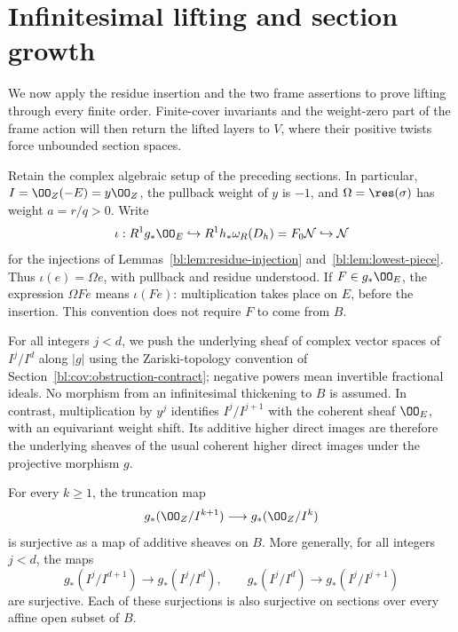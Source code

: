 \section{Infinitesimal lifting and section growth}\label{bl:sec:lifting}

We now apply the residue insertion and the two frame assertions to
prove lifting through every finite order. Finite-cover invariants
and the weight-zero part of the frame action will then return the
lifted layers to \(V\), where their positive twists force unbounded
section spaces.

Retain the complex algebraic setup of the preceding sections.
In particular, \(I=\OO_Z(-E)=y\OO_Z\), the pullback weight of \(y\) is \(-1\), and
\(\Omega=\res(\sigma)\) has weight \(a=r/q>0\).  Write
\begin{equation}\label{bl:lift:insertion}
 \iota:R^1g_*\OO_E\hookrightarrow
 R^1h_*\omega_R(D_h)=F_0\mathcal N\hookrightarrow\mathcal N
\end{equation}
for the injections of Lemmas~\ref{bl:lem:residue-injection}
and~\ref{bl:lem:lowest-piece}.  Thus \(\iota(e)=\Omega e\), with pullback and
residue understood.  If \(F\in g_*\OO_E\), the expression \(\Omega Fe\)
means \(\iota(Fe)\): multiplication takes place on \(E\), before the
insertion.  This convention does not require \(F\) to come from \(B\).

For all integers \(j<d\), we push the underlying sheaf of complex vector
spaces of \(I^j/I^d\) along \(|g|\) using the Zariski-topology convention
of Section~\ref{bl:cov:obstruction-contract}; negative powers mean
invertible fractional ideals. No morphism from an infinitesimal
thickening to \(B\) is assumed. In contrast, multiplication by \(y^j\) identifies
\(I^j/I^{j+1}\) with the coherent sheaf \(\OO_E\), with an equivariant
weight shift.  Its additive higher direct images are therefore the
underlying sheaves of the usual coherent higher direct images under the
projective morphism \(g\).

\begin{proposition}\label{bl:prop:lifting}
For every \(k\geq1\), the truncation map
\begin{equation}\label{bl:lift:successive}
 g_*(\OO_Z/I^{k+1})\longrightarrow g_*(\OO_Z/I^k)
\end{equation}
is surjective as a map of additive sheaves on \(B\).  More generally, for
all integers \(j<d\), the maps
\[
 g_*(I^j/I^{d+1})\longrightarrow g_*(I^j/I^d),
 \qquad
 g_*(I^j/I^d)\longrightarrow g_*(I^j/I^{j+1})
\]
are surjective.  Each of these surjections is also surjective on sections
over every affine open subset of \(B\).
\end{proposition}

